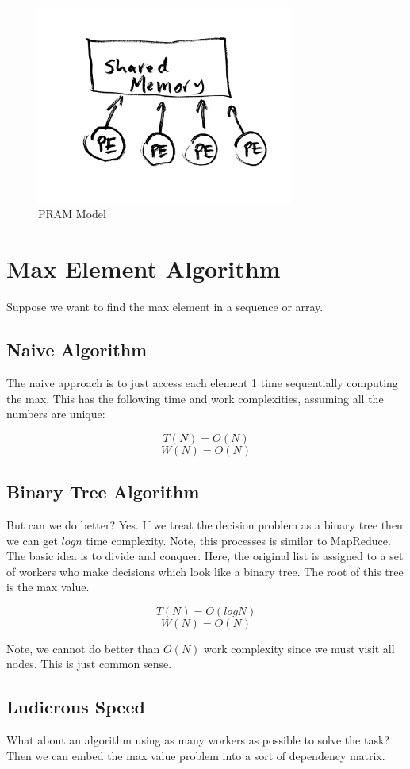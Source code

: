 \documentclass[twoside]{article}
\begin{document}
\begin{figure}[thb]
  \label{fig:pram}
  \centering
  \includegraphics[width=0.75\textwidth]{pram}
  \caption{PRAM Model}
\end{figure}


\section{Max Element Algorithm}
Suppose we want to find the max element in a sequence or array.

\subsection{Naive Algorithm}
The naive approach is to just access each element 1 time sequentially computing the max.
This has the following time and work complexities, assuming all the numbers are unique:

$$T(N) = O(N)$$
$$W(N) = O(N)$$

\subsection{Binary Tree Algorithm}
But can we do better? Yes. If we treat the decision problem as a binary tree then we can get $logn$ time complexity. Note, this processes is similar to MapReduce. The basic idea is to divide and conquer. Here, the original list is assigned to a set of workers who make decisions which look like a binary tree. The root of this tree is the max value.

$$T(N) = O(logN)$$
$$W(N) = O(N)$$

Note, we cannot do better than $O(N)$ work complexity since we must visit all nodes. This is just common sense.
\subsection{Ludicrous Speed}
What about an algorithm using as many workers as possible to solve the task? Then we can embed the max value problem into a sort of dependency matrix.
\end{document}
